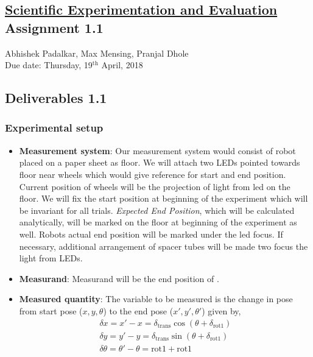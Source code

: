 \documentclass[11pt,a4paper,openright,twoside]{extreport}
\begin{document}
\begin{center}
\section*{\underline{Scientific Experimentation and Evaluation}\\{Assignment 1.1}}
\large{Abhishek Padalkar, Max Mensing, Pranjal Dhole}\\
\large{Due date: Thursday, 19$^{\text{th}}$ April, 2018}
\end{center}

\subsection*{Deliverables 1.1}
\subsubsection*{Experimental setup}
\begin{itemize}
\item \textbf{Measurement system}: Our measurement system would consist of robot placed on a paper sheet as floor. We will attach two LEDs pointed towards floor near wheels which would give reference for start and end position. Current position of wheels will be the projection of light from led on the floor. We will fix the start position at beginning of the experiment which will be invariant for all trials. \textit{Expected End Position}, which will be calculated analytically, will be marked on the floor at beginning of the experiment as well. Robots actual end position will be marked under the led focus. If necessary, additional arrangement of spacer tubes will be made two focus the light from LEDs. 

\item \textbf{Measurand}: Measurand will be the end position of .

\item \textbf{Measured quantity}: The variable to be measured is the change in pose from start pose ($x,y,\theta$) to the end pose ($x',y',\theta'$) given by,
\begin{align*}
\delta x = x' - x = \delta_{\text{trans}} \cos(\theta + \delta_{\text{rot1}}) \\
\delta y = y' - y = \delta_{\text{trans}} \sin(\theta + \delta_{\text{rot1}}) \\
\delta \theta = \theta' - \theta = \text{rot1} + \text{rot1}
\end{align*}
\end{itemize}
\end{document}
